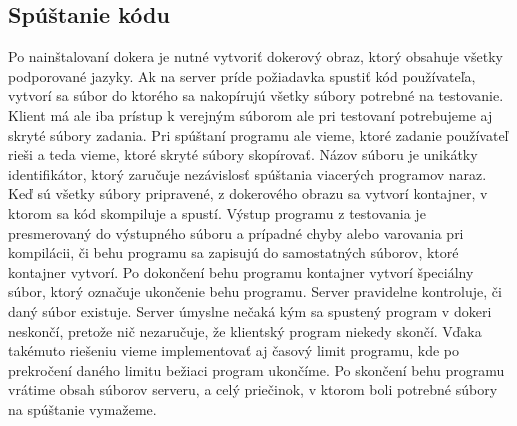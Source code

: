 \subsection{Spúštanie kódu}
Po nainštalovaní dokera je nutné vytvoriť dokerový obraz, ktorý obsahuje všetky podporované
jazyky. Ak na server príde požiadavka spustiť kód používateľa, vytvorí sa súbor do ktorého sa
nakopírujú všetky súbory potrebné na testovanie. Klient má ale iba prístup k verejným súborom ale
pri testovaní potrebujeme aj skryté súbory zadania. Pri spúštaní programu ale vieme, ktoré zadanie
používateľ rieši a teda vieme, ktoré skryté súbory skopírovať. Názov súboru je unikátky
identifikátor, ktorý zaručuje nezávislosť spúštania viacerých programov naraz. Keď sú všetky súbory
pripravené, z dokerového obrazu sa vytvorí kontajner, v ktorom sa kód skompiluje a spustí. Výstup
programu z testovania je presmerovaný do výstupného súboru a prípadné chyby alebo varovania pri
kompilácii, či behu programu sa zapisujú do samostatných súborov, ktoré kontajner vytvorí. Po
dokončení behu programu kontajner vytvorí špeciálny súbor, ktorý označuje ukončenie behu programu.
Server pravidelne kontroluje, či daný súbor existuje. Server úmyslne nečaká kým sa spustený program
v dokeri neskončí, pretože nič nezaručuje, že klientský program niekedy skončí. Vďaka takémuto
riešeniu vieme implementovať aj časový limit programu, kde po prekročení daného limitu bežiaci
program ukončíme. Po skončení behu programu vrátime obsah súborov serveru, a celý priečinok, v
ktorom boli potrebné súbory na spúštanie vymažeme.
